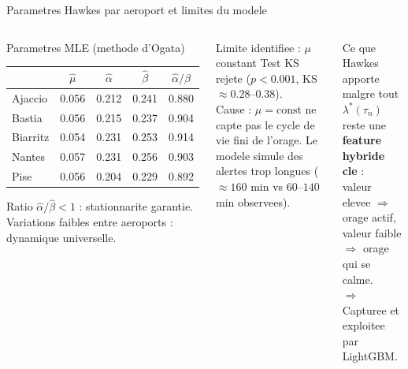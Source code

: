 \documentclass[aspectratio=169, 10pt]{beamer}
\begin{document}
\begin{frame}{Parametres Hawkes par aeroport et limites du modele}
  \begin{columns}[T]
      \begin{block}{Parametres MLE (methode d'Ogata)}
        \centering
        \footnotesize
        \begin{tabular}{lcccc}
          \toprule
          & $\hat\mu$ & $\hat\alpha$ & $\hat\beta$ & $\hat\alpha/\hat\beta$ \\
          \midrule
          Ajaccio  & 0.056 & 0.212 & 0.241 & 0.880 \\
          Bastia   & 0.056 & 0.215 & 0.237 & 0.904 \\
          Biarritz & 0.054 & 0.231 & 0.253 & 0.914 \\
          Nantes   & 0.057 & 0.231 & 0.256 & 0.903 \\
          Pise     & 0.056 & 0.204 & 0.229 & 0.892 \\
          \bottomrule
        \end{tabular}
        \vspace{0.1cm}

        Ratio $\hat\alpha/\hat\beta < 1$ : stationnarite garantie.\\
        Variations faibles entre aeroports : dynamique universelle.
      \end{block}

      \begin{alertblock}{Limite identifiee : $\mu$ constant}
        Test KS rejete ($p < 0.001$, KS $\approx 0.28$--$0.38$).\\[4pt]
        Cause : $\mu = \text{const}$ ne capte pas le cycle de vie fini
        de l'orage. Le modele simule des alertes trop longues
        ($\approx 160$ min vs $60$--$140$ min observees).
      \end{alertblock}
      \vspace{0.2cm}
      \begin{exampleblock}{Ce que Hawkes apporte malgre tout}
        $\lambda^*(\tau_n)$ reste une \textbf{feature hybride cle} :\\[3pt]
        valeur elevee $\Rightarrow$ orage actif,\\
        valeur faible $\Rightarrow$ orage qui se calme.\\[3pt]
        $\Rightarrow$ Capturee et exploitee par LightGBM.
      \end{exampleblock}
  \end{columns}
\end{frame}
\end{document}

